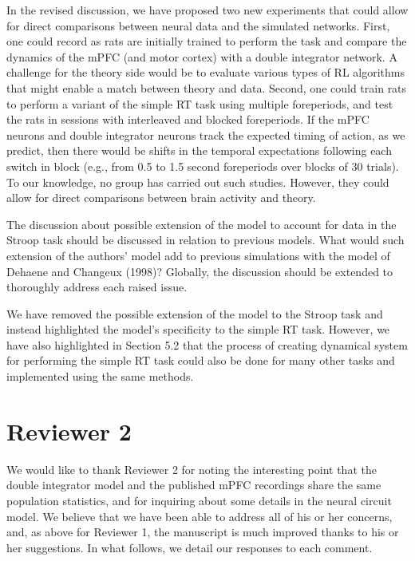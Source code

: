 \documentclass[11pt,paper=letter]{scrartcl}
\begin{document}
In the revised discussion, we have proposed two
new experiments that could allow for
direct comparisons between neural data
and the simulated networks.
First, one could record as rats are initially trained
to perform the task and compare
the dynamics of the mPFC (and motor cortex)
with a double integrator network.
A challenge for the theory side would be
to evaluate various types of RL algorithms
that might enable a match
between theory and data.
Second, one could train rats to perform
a variant of the simple RT task
using multiple foreperiods,
and test the rats in sessions with
interleaved and blocked foreperiods.
If the mPFC neurons
and double integrator neurons track
the expected timing of action,
as we predict, then there would be
shifts in the temporal expectations
following each switch in block
(e.g., from 0.5 to 1.5 second foreperiods
over blocks of 30 trials).
To our knowledge,
no group has carried out such studies.
However, they could allow for
direct comparisons between
brain activity and theory.

\begin{quoting}
  The discussion about possible extension of the model to account for
  data in the Stroop task should be discussed in relation to previous
  models. What would such extension of the authors' model add to
  previous simulations with the model of Dehaene and Changeux (1998)?
  Globally, the discussion should be extended to thoroughly address
  each raised issue.
\end{quoting}

We have removed the possible extension of the model
to the Stroop task and instead highlighted
the model's specificity to the simple RT task.
However, we have also highlighted in Section 5.2
that the process of creating
dynamical system for performing the simple RT task
could also be done for many other tasks
and implemented using the same methods.

\section*{Reviewer 2}

We would like to thank Reviewer 2
for noting the interesting point that
the double integrator model and the published
mPFC recordings share the same
population statistics, and for inquiring
about some details in the neural circuit model.
We believe that we have been able to
address all of his or her concerns,
and, as above for Reviewer 1,
the manuscript is much improved
thanks to his or her suggestions.
In what follows,
we detail our responses to each comment.
\end{document}
